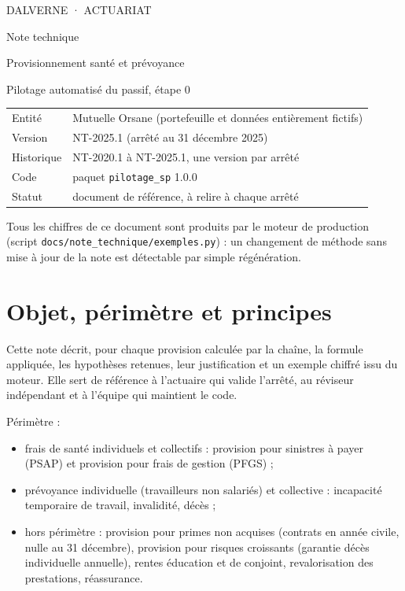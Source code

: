 \documentclass[11pt,a4paper]{article}
\begin{document}
\begin{titlepage}
\vspace*{3cm}
{\color{prune}\small DALVERNE · ACTUARIAT}\par\vspace{0.6cm}
{\titres\Huge\color{violet} Note technique\par}\vspace{0.3cm}
{\titres\Large Provisionnement santé et prévoyance\par}\vspace{0.3cm}
{\large Pilotage automatisé du passif, étape 0\par}
\vspace{1.5cm}
\begin{tabular}{@{}ll}
Entité & Mutuelle Orsane (portefeuille et données entièrement fictifs)\\
Version & NT-2025.1 (arrêté au 31 décembre 2025)\\
Historique & NT-2020.1 à NT-2025.1, une version par arrêté\\
Code & paquet \texttt{pilotage\_sp} 1.0.0\\
Statut & document de référence, à relire à chaque arrêté\\
\end{tabular}
\vfill
{\small\color{gris} Tous les chiffres de ce document sont produits par le moteur de production (script \texttt{docs/note\_technique/exemples.py}) : un changement de méthode sans mise à jour de la note est détectable par simple régénération.}
\end{titlepage}

\tableofcontents
\newpage

\section{Objet, périmètre et principes}

Cette note décrit, pour chaque provision calculée par la chaîne, la formule appliquée, les hypothèses retenues, leur justification et un exemple chiffré issu du moteur. Elle sert de référence à l'actuaire qui valide l'arrêté, au réviseur indépendant et à l'équipe qui maintient le code.

Périmètre :
\begin{itemize}
\item frais de santé individuels et collectifs : provision pour sinistres à payer (PSAP) et provision pour frais de gestion (PFGS) ;
\item prévoyance individuelle (travailleurs non salariés) et collective : incapacité temporaire de travail, invalidité, décès ;
\item hors périmètre : provision pour primes non acquises (contrats en année civile, nulle au 31 décembre), provision pour risques croissants (garantie décès individuelle annuelle), rentes éducation et de conjoint, revalorisation des prestations, réassurance.
\end{itemize}
\end{document}
